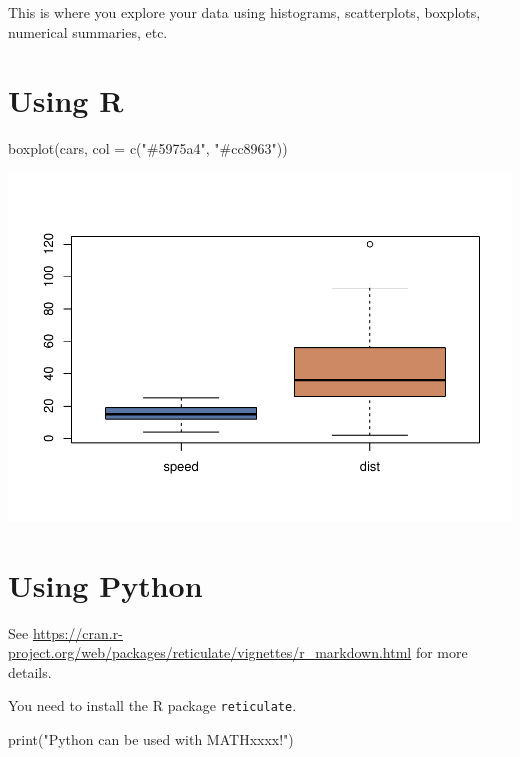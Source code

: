 \documentclass[mstat,12pt]{unswthesis}
\newenvironment{Shaded}{\begin{snugshade}}{\end{snugshade}}
\newcommand{\AttributeTok}[1]{\textcolor[rgb]{0.77,0.63,0.00}{#1}}
\newcommand{\BuiltInTok}[1]{#1}
\newcommand{\FunctionTok}[1]{\textcolor[rgb]{0.00,0.00,0.00}{#1}}
\newcommand{\NormalTok}[1]{#1}
\newcommand{\StringTok}[1]{\textcolor[rgb]{0.31,0.60,0.02}{#1}}
\begin{document}
This is where you explore your data using histograms, scatterplots,
boxplots, numerical summaries, etc.

\hypertarget{using-r}{%
\section{Using R}\label{using-r}}

\begin{Shaded}
\begin{Highlighting}[]
\FunctionTok{boxplot}\NormalTok{(cars, }\AttributeTok{col =} \FunctionTok{c}\NormalTok{(}\StringTok{"\#5975a4"}\NormalTok{, }\StringTok{"\#cc8963"}\NormalTok{))}
\end{Highlighting}
\end{Shaded}

\includegraphics{unsw-ZZSC9020-report_files/figure-latex/unnamed-chunk-1-1.pdf}

\hypertarget{using-python}{%
\section{Using Python}\label{using-python}}

See
\url{https://cran.r-project.org/web/packages/reticulate/vignettes/r_markdown.html}
for more details.

\bigskip

You need to install the R package \texttt{reticulate}.

\begin{Shaded}
\begin{Highlighting}[]
\BuiltInTok{print}\NormalTok{(}\StringTok{"Python can be used with MATHxxxx!"}\NormalTok{)}
\end{Highlighting}
\end{Shaded}
\end{document}
